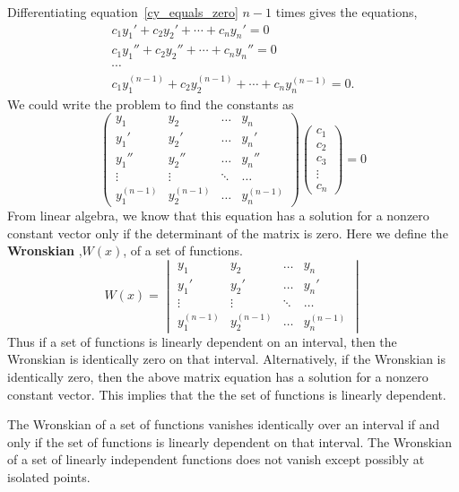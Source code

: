 Differentiating equation~\ref{cy_equals_zero} $n-1$ times gives the equations,
\begin{gather*}
  c_1 y_1' + c_2 y_2' + \cdots + c_n y_n' = 0 \\
  c_1 y_1'' + c_2 y_2'' + \cdots + c_n y_n'' = 0 \\
  \cdots \\
  c_1 y_1^{(n-1)} + c_2 y_2^{(n-1)} + \cdots + c_n y_n^{(n-1)} = 0. 
\end{gather*}
We could write the problem to find the constants as
\[
\begin{pmatrix}
  y_1             & y_2           & \ldots        &y_n \\
  y_1'            & y_2'          & \ldots        &y_n' \\
  y_1''           & y_2''         & \ldots        &y_n'' \\
  \vdots          & \vdots        & \ddots        & \ldots \\
  y_1^{(n-1)}     & y_2^{(n-1)}   & \ldots        &y_n^{(n-1)} 
\end{pmatrix}
\begin{pmatrix}
  c_1 \\  c_2 \\  c_3 \\ \vdots \\        c_n
\end{pmatrix}
= 0
\]
From linear algebra, we know that this equation has a solution for 
a nonzero constant vector only if the determinant of the matrix is zero.
Here we define the \textbf{Wronskian}  ,$W(x)$, of a set of functions.
\[
W(x) = 
\begin{vmatrix}
  y_1             & y_2           & \ldots        &y_n \\
  y_1'            & y_2'          & \ldots        &y_n' \\
  \vdots          & \vdots        & \ddots        & \ldots \\
  y_1^{(n-1)}     & y_2^{(n-1)}   & \ldots        &y_n^{(n-1)} 
\end{vmatrix}
\]
Thus if a set of functions is linearly dependent on an interval, then
the Wronskian is identically zero on that interval.  
Alternatively, if the Wronskian is identically zero, 
then the above matrix equation
has a solution for a nonzero constant vector.  This implies that the 
the set of functions is linearly dependent.

\begin{Result}
  The Wronskian of a set of functions vanishes identically over an interval
  if and only if the set of functions is linearly dependent on that interval.
  The Wronskian of a set of linearly independent functions does not vanish
  except possibly at isolated points.
\end{Result}





